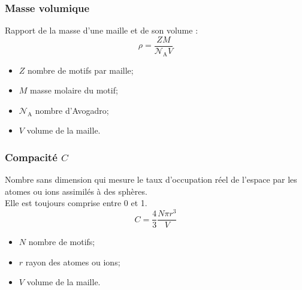 \subsubsection{Masse volumique}
\begin{defi}
    Rapport de la masse d'une maille et de son volume :
    \begin{equation}
        \rho = \frac{ZM}{\mathcal{N}_\text{A}V}\label{eq:masse_volumique}
    \end{equation}
    \begin{itemize}
        \item $Z$ nombre de motifs par maille;
        \item $M$ masse molaire du motif;
        \item $\mathcal{N}_\text{A}$ nombre d'Avogadro;
        \item $V$ volume de la maille.
    \end{itemize}
\end{defi}

\subsubsection{Compacité $C$}
\begin{defi}
    Nombre sans dimension qui mesure le taux d'occupation réel de l'espace
    par les atomes ou ions assimilés à des sphères.\\
    Elle est toujours comprise entre 0 et 1.
    \begin{equation}
        C = \frac{4}{3}\frac{N \pi r^3}{V} \label{eq:comp}
    \end{equation}
    \begin{itemize}
        \item $N$ nombre de motifs;
        \item $r$ rayon des atomes ou ions;
        \item $V$ volume de la maille.
    \end{itemize}
\end{defi}

